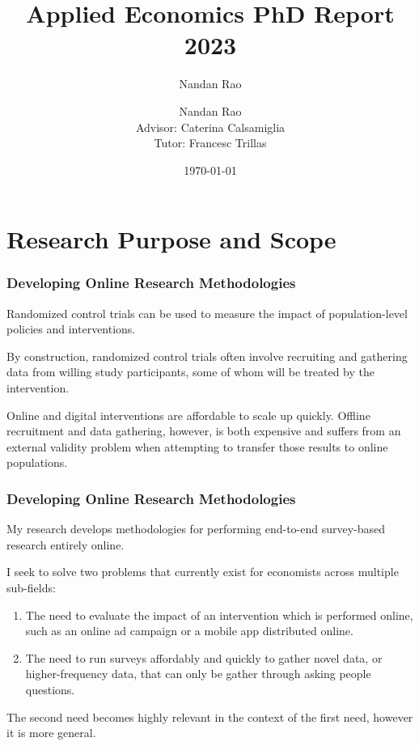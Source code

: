 \documentclass[aspectratio=169]{beamer}
\title[title]{Applied Economics PhD Report 2023} %
\author[Nandan Rao]{Nandan Rao}
\author[me]{Nandan Rao\\[3mm]Advisor: Caterina Calsamiglia\\Tutor: Francesc Trillas}
\date[\today] {\today} %
\begin{document}
\begin{frame}
\titlepage
\end{frame}



\section{Research Purpose and Scope}


\begin{frame}
\frametitle{Developing Online Research Methodologies} 

Randomized control trials can be used to measure the impact of population-level policies and interventions. 

By construction, randomized control trials often involve recruiting and gathering data from willing study participants, some of whom will be treated by the intervention. 

Online and digital interventions are affordable to scale up quickly. Offline recruitment and data gathering, however, is both expensive and suffers from an external validity problem when attempting to transfer those results to online populations. 

\end{frame}


\begin{frame}
\frametitle{Developing Online Research Methodologies} 

My research develops methodologies for performing end-to-end survey-based research entirely online.

I seek to solve two problems that currently exist for economists across multiple sub-fields: 
\begin{enumerate}
\item The need to evaluate the impact of an intervention which is performed online, such as an online ad campaign or a mobile app distributed online. 
\item The need to run surveys affordably and quickly to gather novel data, or higher-frequency data, that can only be gather through asking people questions. 
\end{enumerate}

The second need becomes highly relevant in the context of the first need, however it is more general. 

\end{frame}
\end{document}
